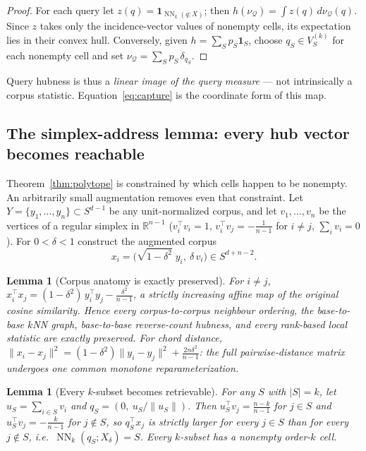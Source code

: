 \documentclass[11pt]{article}
\newcommand{\nuQ}{\nu_{\mathcal{Q}}}
\newcommand{\NN}{\operatorname{NN}}
\newtheorem{lemma}[theorem]{Lemma}
\begin{document}
\begin{proof}
For each query let $z(q) = \mathbf{1}_{\NN_k(q;X)}$; then
$h(\nuQ) = \int z(q)\,d\nuQ(q)$. Since $z$ takes only the incidence-vector
values of nonempty cells, its expectation lies in their convex hull.
Conversely, given $h = \sum_S p_S \mathbf{1}_S$, choose $q_S \in V^{(k)}_S$ for
each nonempty cell and set $\nuQ = \sum_S p_S\,\delta_{q_S}$.
\end{proof}

Query hubness is thus a \emph{linear image of the query measure} --- not
intrinsically a corpus statistic. Equation~\eqref{eq:capture} is the coordinate
form of this map.

\subsection{The simplex-address lemma: every hub vector becomes reachable}

Theorem~\ref{thm:polytope} is constrained by which cells happen to be nonempty.
An arbitrarily small augmentation removes even that constraint. Let
$Y = \{y_1,\dots,y_n\} \subset S^{d-1}$ be any unit-normalized corpus, and let
$v_1,\dots,v_n$ be the vertices of a regular simplex in $\mathbb{R}^{n-1}$
($v_i^\top v_i = 1$, $v_i^\top v_j = -\tfrac{1}{n-1}$ for $i \neq j$,
$\sum_i v_i = 0$). For $0 < \delta < 1$ construct the augmented corpus
\[
x_i = \bigl(\sqrt{1-\delta^2}\; y_i,\ \delta\, v_i\bigr) \in S^{d+n-2}.
\]

\begin{lemma}[Corpus anatomy is exactly preserved]\label{lem:preserve}
For $i \neq j$,
$x_i^\top x_j = (1-\delta^2)\, y_i^\top y_j - \tfrac{\delta^2}{n-1}$,
a strictly increasing affine map of the original cosine similarity. Hence every
corpus-to-corpus neighbour ordering, the base-to-base $k$NN graph, base-to-base
reverse-count hubness, and every rank-based local statistic are \emph{exactly}
preserved. For chord distance,
$\|x_i - x_j\|^2 = (1-\delta^2)\|y_i-y_j\|^2 + \tfrac{2n\delta^2}{n-1}$:
the full pairwise-distance matrix undergoes one common monotone
reparameterization.
\end{lemma}

\begin{lemma}[Every $k$-subset becomes retrievable]\label{lem:address}
For any $S$ with $|S| = k$, let $u_S = \sum_{i \in S} v_i$ and
$q_S = (0,\ u_S/\|u_S\|)$. Then $u_S^\top v_j = \tfrac{n-k}{n-1}$ for
$j \in S$ and $u_S^\top v_j = -\tfrac{k}{n-1}$ for $j \notin S$, so
$q_S^\top x_j$ is strictly larger for every $j \in S$ than for every
$j \notin S$, i.e.\ $\NN_k(q_S; X_\delta) = S$. Every $k$-subset has a
nonempty order-$k$ cell.
\end{lemma}
\end{document}
